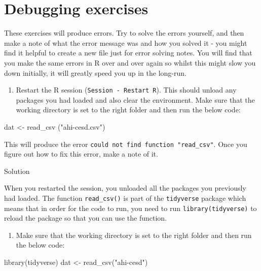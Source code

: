 \documentclass[
  oneside]{book}
\newenvironment{Shaded}{\begin{snugshade}}{\end{snugshade}}
\newcommand{\FunctionTok}[1]{\textcolor[rgb]{0.00,0.00,0.00}{#1}}
\newcommand{\NormalTok}[1]{#1}
\newcommand{\OtherTok}[1]{\textcolor[rgb]{0.56,0.35,0.01}{#1}}
\newcommand{\StringTok}[1]{\textcolor[rgb]{0.31,0.60,0.02}{#1}}
\providecommand{\tightlist}{%
  \setlength{\itemsep}{0pt}\setlength{\parskip}{0pt}}
\begin{document}
\hypertarget{debugging-exercises}{%
\section{Debugging exercises}\label{debugging-exercises}}

These exercises will produce errors. Try to solve the errors yourself, and then make a note of what the error message was and how you solved it - you might find it helpful to create a new file just for error solving notes. You will find that you make the same errors in R over and over again so whilst this might slow you down initially, it will greatly speed you up in the long-run.

\begin{enumerate}
\def\labelenumi{\arabic{enumi}.}
\tightlist
\item
  Restart the R session (\texttt{Session\ -\ Restart\ R}). This should unload any packages you had loaded and also clear the environment. Make sure that the working directory is set to the right folder and then run the below code:
\end{enumerate}

\begin{Shaded}
\begin{Highlighting}[]
\NormalTok{dat }\OtherTok{\textless{}{-}} \FunctionTok{read\_csv}\NormalTok{ (}\StringTok{"ahi{-}cesd.csv"}\NormalTok{)}
\end{Highlighting}
\end{Shaded}

This will produce the error \texttt{could\ not\ find\ function\ "read\_csv"}. Once you figure out how to fix this error, make a note of it.

Solution

When you restarted the session, you unloaded all the packages you previously had loaded. The function \texttt{read\_csv()} is part of the \texttt{tidyverse} package which means that in order for the code to run, you need to run \texttt{library(tidyverse)} to reload the package so that you can use the function.

\begin{enumerate}
\def\labelenumi{\arabic{enumi}.}
\setcounter{enumi}{1}
\tightlist
\item
  Make sure that the working directory is set to the right folder and then run the below code:
\end{enumerate}

\begin{Shaded}
\begin{Highlighting}[]
\FunctionTok{library}\NormalTok{(tidyverse)}
\NormalTok{dat }\OtherTok{\textless{}{-}} \FunctionTok{read\_csv}\NormalTok{(}\StringTok{"ahi{-}cesd"}\NormalTok{)}
\end{Highlighting}
\end{Shaded}
\end{document}
